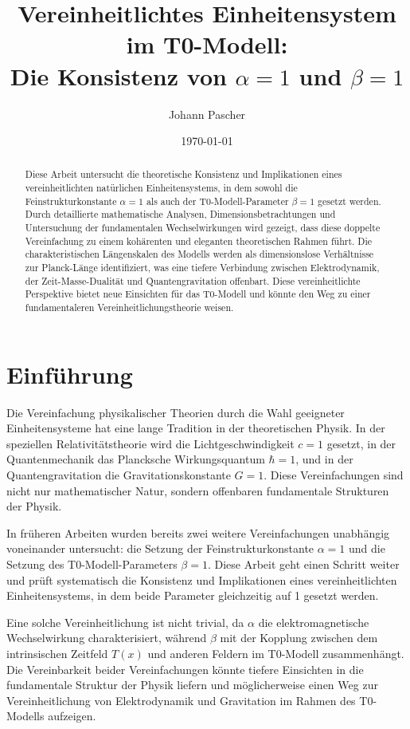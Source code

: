 \documentclass[12pt,a4paper]{article}
\title{Vereinheitlichtes Einheitensystem im T0-Modell: \\Die Konsistenz von \(\alpha = 1\) und \(\beta = 1\)}
\author{Johann Pascher}
\date{\today}
\newcommand{\Tfield}{T(x)}
\begin{document}
	
	\maketitle
	
	\begin{abstract}
		Diese Arbeit untersucht die theoretische Konsistenz und Implikationen eines vereinheitlichten natürlichen Einheitensystems, in dem sowohl die Feinstrukturkonstante \(\alpha = 1\) als auch der T0-Modell-Parameter \(\beta = 1\) gesetzt werden. Durch detaillierte mathematische Analysen, Dimensionsbetrachtungen und Untersuchung der fundamentalen Wechselwirkungen wird gezeigt, dass diese doppelte Vereinfachung zu einem kohärenten und eleganten theoretischen Rahmen führt. Die charakteristischen Längenskalen des Modells werden als dimensionslose Verhältnisse zur Planck-Länge identifiziert, was eine tiefere Verbindung zwischen Elektrodynamik, der Zeit-Masse-Dualität und Quantengravitation offenbart. Diese vereinheitlichte Perspektive bietet neue Einsichten für das T0-Modell und könnte den Weg zu einer fundamentaleren Vereinheitlichungstheorie weisen.
	\end{abstract}
	
	\tableofcontents
	\newpage
	
	\section{Einführung}
	
	Die Vereinfachung physikalischer Theorien durch die Wahl geeigneter Einheitensysteme hat eine lange Tradition in der theoretischen Physik. In der speziellen Relativitätstheorie wird die Lichtgeschwindigkeit \(c = 1\) gesetzt, in der Quantenmechanik das Plancksche Wirkungsquantum \(\hbar = 1\), und in der Quantengravitation die Gravitationskonstante \(G = 1\). Diese Vereinfachungen sind nicht nur mathematischer Natur, sondern offenbaren fundamentale Strukturen der Physik.
	
	In früheren Arbeiten \cite{pascher_alpha_2025, pascher_beta_2025} wurden bereits zwei weitere Vereinfachungen unabhängig voneinander untersucht: die Setzung der Feinstrukturkonstante \(\alpha = 1\) und die Setzung des T0-Modell-Parameters \(\beta = 1\). Diese Arbeit geht einen Schritt weiter und prüft systematisch die Konsistenz und Implikationen eines vereinheitlichten Einheitensystems, in dem beide Parameter gleichzeitig auf 1 gesetzt werden.
	
	Eine solche Vereinheitlichung ist nicht trivial, da \(\alpha\) die elektromagnetische Wechselwirkung charakterisiert, während \(\beta\) mit der Kopplung zwischen dem intrinsischen Zeitfeld \(\Tfield\) und anderen Feldern im T0-Modell zusammenhängt. Die Vereinbarkeit beider Vereinfachungen könnte tiefere Einsichten in die fundamentale Struktur der Physik liefern und möglicherweise einen Weg zur Vereinheitlichung von Elektrodynamik und Gravitation im Rahmen des T0-Modells aufzeigen.
	
\end{document}
